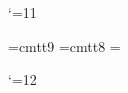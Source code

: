 

%
%
%



%
%
%
%

\catcode`\@=11\relax

\font\cellf@nt=cmtt9 %
\def\v@rbsize{\baselineskip 9pt \parskip 0pt plus 1pt \cellf@nt}
\font\b@xfont=cmtt8 %
\newbox\t@bbox \setbox\t@bbox=\hbox{\b@xfont\ }
\newdimen\w {}\wd\t@bbox%

\def\@mmatok{mathematica}
\def\begin#1{\def\testtok{#1}
	\ifx\testtok\@mmatok
		\let\next = \@mma
	\else
		\errmessage{Environment #1 undefined.}
		\let\next = \relax
	\fi
	\next}



\catcode`\@=12\relax

